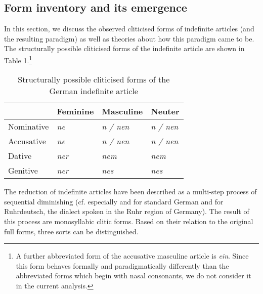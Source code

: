 \subsection{Form inventory and its emergence}
\label{subsec:12formInventory}

In this section, we discuss the observed cliticised forms of indefinite articles (and the resulting paradigm) as well as theories about how this paradigm came to be. 
The structurally possible cliticised forms of the indefinite article are shown in Table 1.\footnote{
	A further abbreviated form of the accusative masculine article is \textit{ein}. Since this form behaves formally and paradigmatically differently than the abbreviated forms which begin with nasal consonants, we do not consider it in the current analysis.}

\begin{table}
	\centering
	\begin{tabular}{llll}
		\toprule
		\textbf{} & \textbf{Feminine} & \textbf{Masculine} & \textbf{Neuter} \\
		\midrule
		Nominative & \textit{ne} & \textit{n / nen} & \textit{n / nen} \\
		Accusative & \textit{ne} & \textit{n / nen} & \textit{n / nen} \\
		Dative & \textit{ner} & \textit{nem} & \textit{nem} \\
		Genitive & \textit{ner} & \textit{nes} & \textit{nes} \\
		\bottomrule
	\end{tabular}
	\caption{Structurally possible cliticised forms of the German indefinite article}
	\label{tab:0001}
\end{table}

The reduction of indefinite articles have been described as a multi-step process of sequential diminishing (cf. especially \citealt[46]{Dedenbach1987} and \citet[92]{Prinz1991} for standard German and \citealt{Schiering2002} for Ruhrdeutsch, the dialect spoken in the Ruhr region of Germany). 
The result of this process are monosyllabic clitic forms. 
Based on their relation to the original full forms, three sorts can be distinguished.

